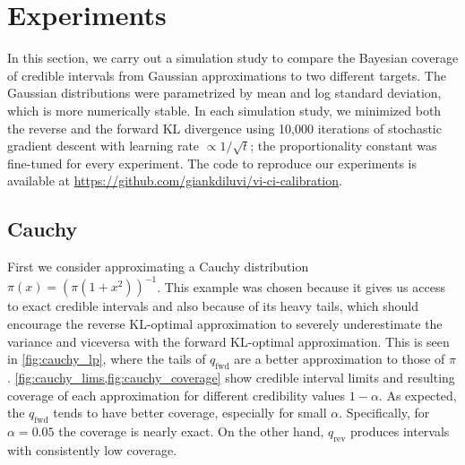 \section{Experiments} \label{sec:experiments}

In this section,
we carry out a simulation study to compare
the Bayesian coverage of credible intervals
from Gaussian approximations to two different targets.
The Gaussian distributions were parametrized by mean
and log standard deviation,
which is more numerically stable.
In each simulation study,
we minimized both the reverse and the forward KL divergence
using 10,000 iterations of stochastic gradient descent
with learning rate $\propto 1/\sqrt{t}$;
the proportionality constant was fine-tuned for every experiment.
The code to reproduce our experiments is available at
\url{https://github.com/giankdiluvi/vi-ci-calibration}.


\subsection{Cauchy} \label{subsec:cauchy}

First we consider approximating a Cauchy distribution
$\pi(x)=(\pi(1+x^2))^{-1}$.
This example was chosen because it gives us access to exact
credible intervals and also because of its heavy tails,
which should encourage the reverse KL-optimal
approximation to severely underestimate the variance
and viceversa with the forward KL-optimal approximation.
This is seen in \cref{fig:cauchy_lp},
where the tails of $q_\mathrm{fwd}$ are a better
approximation to those of $\pi$.
\cref{fig:cauchy_lims,fig:cauchy_coverage}
show credible interval limits
and resulting coverage of each approximation
for different credibility values $1-\alpha$.
As expected, the $q_\mathrm{fwd}$ tends to have better coverage,
especially for small $\alpha$.
Specifically, for $\alpha=0.05$
the coverage is nearly exact.
On the other hand, $q_\mathrm{rev}$ produces
intervals with consistently low coverage.

